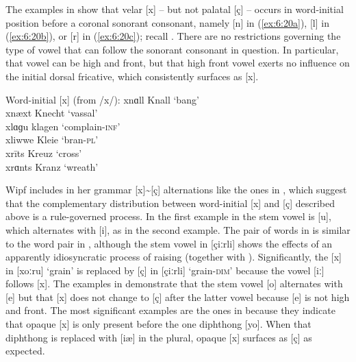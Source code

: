 The examples in  show that velar [x] -- but not palatal [ç] -- occurs in word-initial position before a coronal sonorant consonant, namely [n] in (\ref{ex:6:20a}), [l] in (\ref{ex:6:20b}), or [r] in (\ref{ex:6:20c}); recall . There are no restrictions governing the type of vowel that can follow the sonorant consonant in question. In particular, that vowel can be high and front, but that high front vowel exerts no influence on the initial dorsal fricative, which consistently surfaces as [x].

\ea%
\label{ex:6:20}Word-initial [x] (from /x/):
\ea\label{ex:6:20a} xnɑll    \tab [xnɑll]  \tab Knall  \tab ‘bang’                    \\
      xnæxt  \tab [xnæxt]  \tab Knecht \tab ‘vassal’                 \\
\ex\label{ex:6:20b} xlɑɡu    \tab [xlɑgu]  \tab klagen \tab ‘complain-\textsc{inf}’   \\
      xliwwe \tab [xliwwe] \tab Kleie  \tab ‘bran-\textsc{pl}’        \\
\ex\label{ex:6:20c} xrīts    \tab [xriːts] \tab Kreuz  \tab ‘cross’                   \\
      xrɑnts \tab [xrɑnts] \tab Kranz  \tab ‘wreath’                  \\
\z 
\z

Wipf includes in her grammar [x]{\textasciitilde}[ç] alternations like the ones in , which suggest that the complementary distribution between word-initial [x] and [ç] described above is a rule-governed process. In the first example in  the stem vowel is [u], which alternates with [i], as in the second example. The pair of words in  is similar to the word pair in , although the stem vowel in [çiːrli] shows the effects of an apparently idiosyncratic process of raising (together with ). Significantly, the [x] in [xoːru] ‘grain’ is replaced by [ç] in [çiːrli] ‘grain-\textsc{dim}’ because the vowel [iː] follows [x]. The examples in  demonstrate that the stem vowel [o] alternates with [e] but that [x] does not change to [ç] after the latter vowel because [e] is not high and front. The most significant examples are the ones in  because they indicate that opaque [x] is only present before the one diphthong [yo]. When that diphthong is replaced with [iæ] in the plural, opaque [x] surfaces as [ç] as expected.

